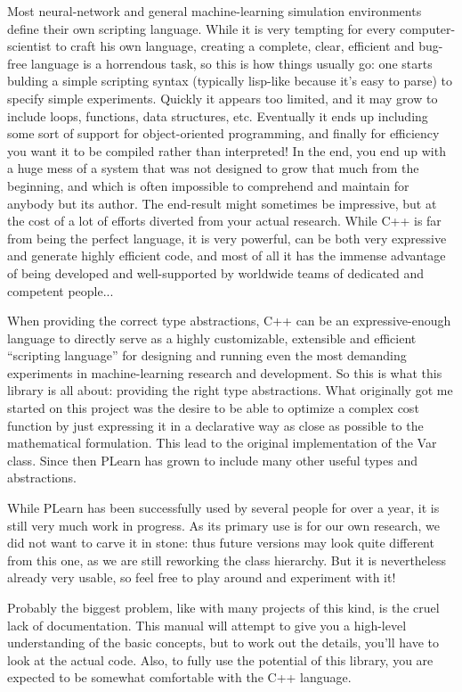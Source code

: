 \documentclass[11pt]{book}
\begin{document}
 Most neural-network and general machine-learning simulation
environments define their own scripting language. While it is very
tempting for every computer-scientist to craft his own language,
creating a complete, clear, efficient and bug-free language is
a horrendous task, so this is how things usually go: one starts
bulding a simple scripting syntax (typically lisp-like because
it's easy to parse) to specify simple experiments. Quickly it
appears too limited, and it may grow to include loops, functions,
data structures, etc. Eventually it ends up including some sort of
support for object-oriented programming, and finally for efficiency
you want it to be compiled rather than interpreted! In the end,
you end up with a huge mess of a system that was not designed to
grow that much from the beginning, and which is often impossible to
comprehend and maintain for anybody but its author. The end-result
might sometimes be impressive, but at the cost of a lot of efforts
diverted from your actual research. While C++ is far from being the
perfect language, it is very powerful, can be both very expressive and
generate highly efficient code, and most of all it has the immense
advantage of being developed and well-supported by worldwide teams
of dedicated and competent people...


 When providing the correct type abstractions, C++ can be an expressive-enough language to directly serve as a highly customizable, extensible and efficient ``scripting language'' for designing and running even the most demanding experiments in machine-learning research and development. So this is what this library is all about: providing the right type abstractions. What originally got me started on this project was the desire to be able to optimize a complex cost function by just expressing it in a declarative way as close as possible to the mathematical formulation. This lead to the original implementation of the Var class. Since then PLearn has grown to include many other useful types and abstractions. 


 While PLearn has been successfully used by several people for over a year, it is still very much work in progress. As its primary use is for our own research, we did not want to carve it in stone: thus future versions may look quite different from this one, as we are still reworking the class hierarchy. But it is nevertheless already very usable, so feel free to play around and experiment with it! 


 Probably the biggest problem, like with many projects of this kind, is the cruel lack of documentation. This manual will attempt to give you a high-level understanding of the basic concepts, but to work out the details, you'll have to look at the actual code. Also, to fully use the potential of this library, you are expected to be somewhat comfortable with the C++ language. 
\end{document}
